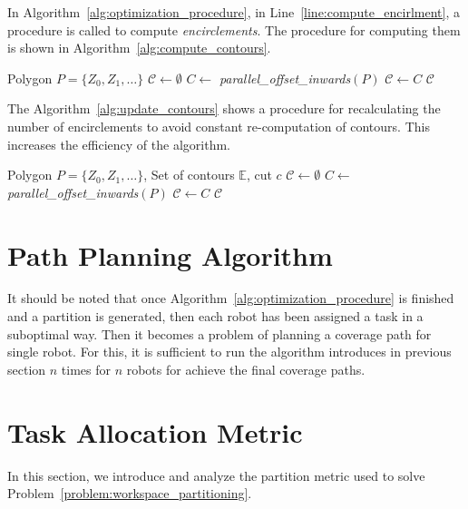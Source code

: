 \documentclass[../main.tex]{subfiles}
\begin{document}
In Algorithm~\ref{alg:optimization_procedure}, in Line~\ref{line:compute_encirlment}, a procedure is called to compute \emph{encirclements}. The procedure for computing them is shown in Algorithm~\ref{alg:compute_contours}.
\begin{algorithm}
	\small
	\caption{$\operatorname{compute\_encirclements}$}
	\label{alg:compute_contours}
	\begin{algorithmic}[1]
		\REQUIRE Polygon $P=\{Z_0,Z_1,\ldots\}$
		\STATE $\mathcal{C}\gets\emptyset$ 
		\REPEAT
			\STATE $C\gets$ \textit{parallel\_offset\_inwards}$(P)$
			\STATE $\mathcal{C}\gets C$
		\RETURN $\mathcal{C}$
	\end{algorithmic}
\end{algorithm}

The Algorithm~\ref{alg:update_contours} shows a procedure for recalculating the number of encirclements to avoid constant re-computation of contours. This increases the efficiency of the algorithm.
\begin{algorithm}
	\small
	\caption{$\operatorname{recalc\_encirclements}$}
	\label{alg:update_contours}
	\begin{algorithmic}[1]
		\REQUIRE Polygon $P=\{Z_0,Z_1,\ldots\}$, Set of contours $\mathbb{E}$, cut $c$
		\STATE $\mathcal{C}\gets\emptyset$ 
		\REPEAT
			\STATE $C\gets$ \textit{parallel\_offset\_inwards}$(P)$
			\STATE $\mathcal{C}\gets C$
		\RETURN $\mathcal{C}$
	\end{algorithmic}
\end{algorithm}


\section{Path Planning Algorithm}
It should be noted that once Algorithm~\ref{alg:optimization_procedure} is finished and a partition is generated, then each robot has been assigned a task in a suboptimal way. Then it becomes a problem of planning a coverage path for single robot. For this, it is sufficient to run the algorithm introduces in previous section $n$ times for $n$ robots for achieve the final coverage paths.


\section{Task Allocation Metric}
\label{sec:task_allocation_metric}

In this section, we introduce and analyze the partition metric used to solve Problem~\ref{problem:workspace_partitioning}.
\end{document}
